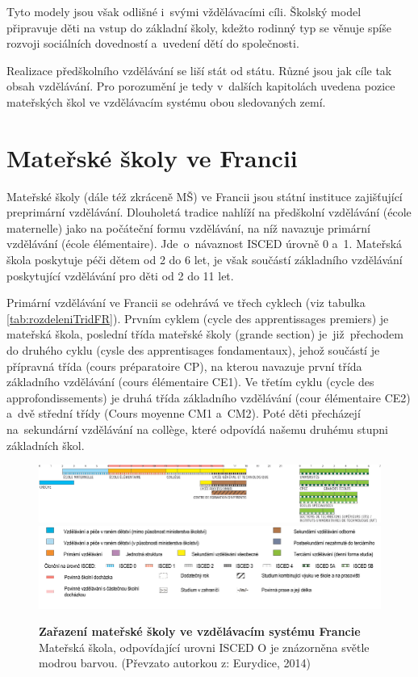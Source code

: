 		Tyto modely jsou však odlišné i~svými vždělávacími cíli. Školský model připravuje děti na vstup do základní školy, kdežto rodinný typ se věnuje spíše rozvoji sociálních dovedností a~uvedení dětí do společnosti.

		Realizace předškolního vzdělávání se liší stát od státu. Různé jsou jak cíle tak obsah vzdělávání. Pro porozumění je tedy v~dalších kapitolách uvedena pozice mateřských škol ve vzdělávacím systému obou sledovaných zemí. 
		

	\section{Mateřské školy ve Francii}
	\label{msvefr}

		Mateřské školy (dále též zkráceně MŠ) ve Francii jsou státní instituce zajišťující preprimární vzdělávání. 
		Dlouholetá tradice nahlíží na předškolní vzdělávání (école maternelle) jako na počáteční formu vzdělávání, na níž navazuje primární vzdělávání (école élémentaire). Jde o návaznost ISCED  úrovně 0 a~1. Mateřská škola poskytuje péči dětem od 2 do 6 let, je však součástí základního vzdělávání poskytující vzdělávání pro děti od 2 do 11 let.

		Primární vzdělávání ve Francii se odehrává ve třech cyklech (viz tabulka \ref{tab:rozdeleniTridFR}). Prvním cyklem (cycle des apprentissages premiers) je mateřská škola, poslední třída mateřské školy (grande section) je již přechodem do druhého cyklu (cysle des apprentisages fondamentaux), jehož součástí je přípravná třída (cours préparatoire CP), na kterou navazuje první třída základního vzdělávání (cours élémentaire CE1). Ve třetím cyklu (cycle des approfondissements) je druhá třída základního vzdělávání (cour élémentaire CE2) a~dvě střední třídy (Cours moyenne CM1 a~CM2). Poté děti přecházejí na sekundární vzdělávání na collège, které odpovídá našemu druhému stupni základních škol. 

		\begin{figure} [h!]
			\center
			\includegraphics[width=1.0\linewidth]{fotky/msFR.png} \\
			\includegraphics[width=1.0\linewidth]{fotky/msVysvetlivky.png}
			\caption{ \textbf{Zařazení mateřské školy ve vzdělávacím systému Francie} Mateřská škola, odpovídající urovni ISCED O je znázorněna světle modrou barvou.
			(Převzato autorkou z: Eurydice, 2014)
			}
			\label{obr:msFR}
		\end{figure}

